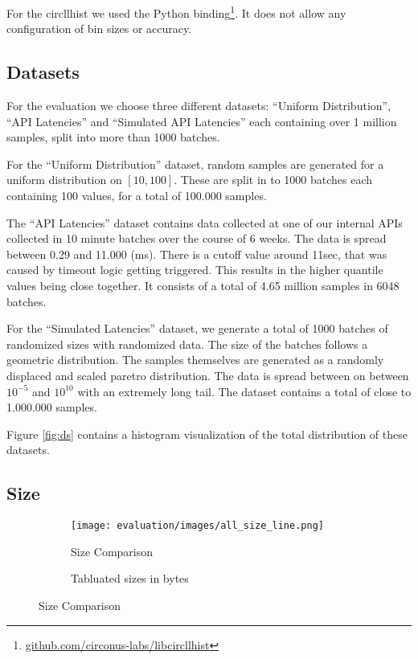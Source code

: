 \documentclass{article}
\theoremstyle{plain}
\theoremstyle{remark}
\begin{document}
For the circllhist we used the Python binding\footnote{\url{github.com/circonus-labs/libcircllhist}}.
It does not allow any configuration of bin sizes or accuracy.

\subsection{Datasets}

For the evaluation we choose three different datasets: ``Uniform Distribution'', ``API Latencies'' and ``Simulated API Latencies''
each containing over 1 million samples, split into more than 1000 batches.

For the ``Uniform Distribution'' dataset, random samples are generated for a uniform distribution on $[10,100]$.
These are split in to 1000 batches each containing 100 values, for a total of 100.000 samples.

The ``API Latencies'' dataset contains data collected at one of our internal APIs collected in 10
minute batches over the course of 6 weeks.  The data is spread between 0.29 and 11.000 (ms).  There
is a cutoff value around 11sec, that was caused by timeout logic getting triggered.  This results in
the higher quantile values being close together.  It consists of a total of 4.65 million samples in
6048 batches.

For the ``Simulated Latencies'' dataset, we generate a total of 1000 batches of randomized sizes
with randomized data.  The size of the batches follows a geometric distribution.  The samples
themselves are generated as a randomly displaced and scaled paretro distribution.  The data is
spread between on between $10^{-5}$ and $10^{10}$ with an extremely long tail.  The dataset contains
a total of close to 1.000.000 samples.

Figure \ref{fig:ds} contains a histogram visualization of the total distribution of these datasets.

\subsection{Size}

\begin{figure}
    \begin{subfigure}{0.33\textwidth}
      \texttt{[image: evaluation/images/all\_size\_line.png]}
      \caption{Size Comparison}
      \label{fig:size}
    \end{subfigure}
    \begin{subfigure}{0.66\textwidth}
      
      \caption{Tabluated sizes in bytes}
      \label{fig:tsize}
    \end{subfigure}
    \caption{Size Comparison}
\end{figure}
\end{document}
